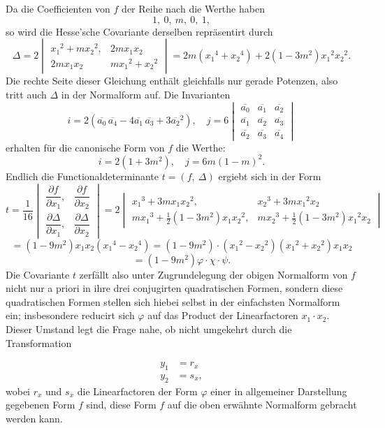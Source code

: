 Da die Coefficienten von $f$ der Reihe nach die Werthe haben
\[
1,\ 0,\ m,\ 0,\ 1,
\]
so wird die Hesse'sche Covariante derselben repräsentirt durch
\[
\Delta=2\begin{vmatrix}x_1{}^2+mx_2{}^2, & 2mx_1x_2\\ 2mx_1x_2 & mx_1{}^2+x_2{}^2\end{vmatrix}=2m(x_1{}^4+x_2{}^4)+2(1-3m^2)x_1{}^2x_2{}^2.
\]
Die rechte Seite dieser Gleichung enthält gleichfalls nur gerade Potenzen, also tritt auch $\Delta$ in der Normalform auf. Die Invarianten
\[
i=2(\overline{a_0}\,\overline{a_4}-4\overline{a_1}\,\overline{a_3}+3\overline{a_2}{}^2),\quad j=6\begin{vmatrix}\overline{a_0} & \overline{a_1} & \overline{a_2}\\ \overline{a_1} & \overline{a_2} & \overline{a_3}\\ \overline{a_2} & \overline{a_3} & \overline{a_4}\end{vmatrix}
\]
erhalten für die canonische Form von $f$ die Werthe:
\[
i=2(1+3m^2),\quad j=6m(1-m)^2.
\]
Endlich die Functionaldeterminante $t=(f,\ \Delta)$ ergiebt sich in der Form
\[
t=\frac{1}{16}\begin{vmatrix}\dfrac{\partial f}{\partial x_1}, & \dfrac{\partial f}{\partial x_2}\\ \dfrac{\partial\Delta}{\partial x_1}, & \dfrac{\partial\Delta}{\partial x_2}\end{vmatrix}=2\begin{vmatrix}x_1{}^3+3mx_1x_2{}^2, & x_2{}^3+3mx_1{}^2x_2\\ mx_1{}^3+\frac{1}{2}(1-3m^2)x_1x_2{}^2, & mx_2{}^3+\frac{1}{2}(1-3m^2)x_1{}^2x_2\end{vmatrix}
\]
\[
=(1-9m^2)x_1x_2(x_1{}^4-x_2{}^4)=(1-9m^2)\cdot(x_1{}^2-x_2{}^2)(x_1{}^2+x_2{}^2)x_1x_2
\]
\[
=(1-9m^2)\varphi\cdot\chi\cdot\psi.
\]
Die Covariante $t$ zerfällt also unter Zugrundelegung der obigen Normalform von $f$ nicht nur a priori in ihre drei conjugirten quadratischen Formen, sondern diese quadratischen Formen stellen sich hiebei selbst in der einfachsten Normalform ein; insbesondere reducirt sich $\varphi$ auf das Product der Linearfactoren $x_1\cdot x_2$. Dieser Umstand legt die Frage nahe, ob nicht umgekehrt durch die Transformation


\[
\begin{aligned}
y_1&=r_x\\
y_2&=s_x,
\end{aligned}
\]
wobei $r_x$ und $s_x$ die Linearfactoren der Form $\varphi$ einer in allgemeiner Darstellung gegebenen Form $f$ sind, diese Form $f$ auf die oben erwähnte Normalform gebracht werden kann.

